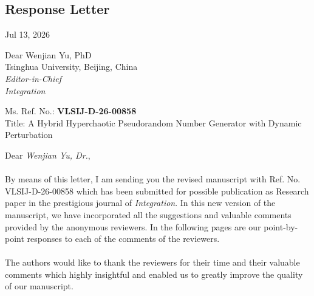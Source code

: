 \documentclass{report}
\begin{document}
\begin{center}
\section*{Response Letter}
\end{center}

\vspace{0.8cm} %

\begin{flushright}
Jul 13, 2026
\end{flushright}

\vspace{0.5cm} %

\begin{flushleft}
Dear Wenjian Yu, PhD \\
Tsinghua University, Beijing, China \\
\textit{Editor-in-Chief} \\
\textit{Integration}	\\
\end{flushleft}

\vspace{0.6cm} %


\begin{flushright}
 Ms. Ref. No.:  \textbf{VLSIJ-D-26-00858} \\
Title: A Hybrid Hyperchaotic Pseudorandom Number Generator with Dynamic Perturbation
 \end{flushright} 


\vspace{1.5cm} %

Dear \textit{Wenjian Yu, Dr.}, \\
\\
By means of this letter, I am sending you the revised manuscript with Ref. No. VLSIJ-D-26-00858 which has been submitted for possible publication as Research paper in the prestigious journal of \textit{Integration}. In this new version of the manuscript, we have incorporated all the suggestions and valuable comments provided by the anonymous reviewers. In the following pages are our point-by-point responses to each of the comments of the reviewers.  
\\
\\
The authors would like to thank the reviewers for their time and their valuable comments which highly insightful and enabled us to greatly improve the quality of our manuscript. 

\vspace{1cm} %
\end{document}
